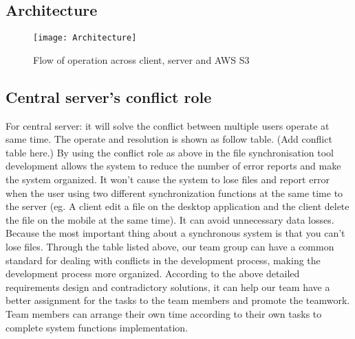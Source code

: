 \subsection{Architecture}

\begin{figure}[h!]
\centering
\texttt{[image: Architecture]}
\caption{Flow of operation across client, server and AWS S3}
\end{figure}


\subsection{Central server’s conflict role}
For central server: it will solve the conflict between multiple users operate at same time. The operate and resolution is shown as follow table.\newline
(Add conflict table here.)\newline
By using the conflict role as above in the file synchronisation tool development allows the system to reduce the number of error reports and make the system organized. It won't cause the system to lose files and report error when the user using two different synchronization functions at the same time to the server (eg. A client edit a file on the desktop application and the client delete the file on the mobile at the same time). It can avoid unnecessary data losses. Because the most important thing about a synchronous system is that you can't lose files. Through the table listed above, our team group can have a common standard for dealing with conflicts in the development process, making the development process more organized.\newline
According to the above detailed requirements design and contradictory solutions, it can help our team have a better assignment for the tasks to the team members and promote the teamwork. Team members can arrange their own time according to their own tasks to complete system functions implementation.\newline
